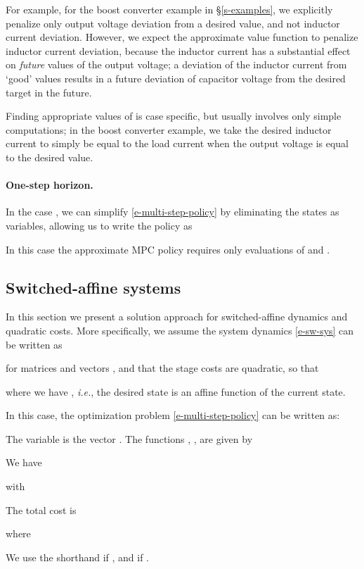 \documentclass[12pt]{article}
\newcommand{\ie}{{\it i.e.}}
\begin{document}
For example, for the boost converter example in \S\ref{s-examples},
we explicitly penalize only output voltage deviation from a desired value,
and not inductor current deviation.
However, we expect the approximate value function to penalize
inductor current deviation,
because the inductor current has a substantial effect
on \emph{future} values of the output voltage;
a deviation of the inductor current from `good' values
results in a future deviation of capacitor voltage from the
desired target in the future.

Finding appropriate values of  is case specific,
but usually involves only simple computations;
in the boost converter example,
we take the desired inductor current to simply be equal to the load current
when the output voltage is equal to the desired value.



\paragraph{One-step horizon.}
In the case , we can simplify 
\eqref{e-multi-step-policy}
by eliminating the states as variables,
allowing us to write the policy as

In this case the approximate MPC policy requires only 
 evaluations of  and .


\subsection{Switched-affine systems}
In this section we present a solution approach
for switched-affine dynamics and quadratic costs.
More specifically, we assume the system dynamics \eqref{e-sw-sys}
can be written as

for matrices  and vectors ,
and that the stage costs  are quadratic, so that

where we have ,
\ie, the desired state is an affine function of the current state.

In this case, 
the optimization problem \eqref{e-multi-step-policy}
can be written as:

The variable is the vector 
.
The functions , , 
are given by


\begin{derivations}
We have

with


The total cost is

where

\end{derivations}
We use the shorthand  if ,
and  if .
\end{document}
